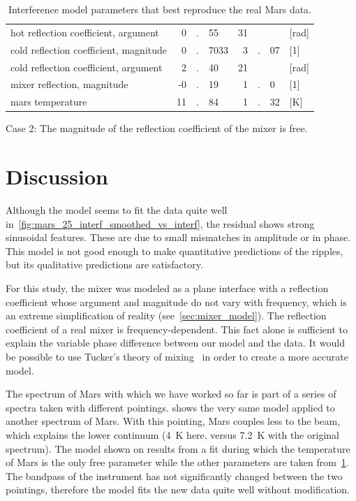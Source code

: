 \begin{table}
\begin{tabular}{l r@{}c@{}l r@{}c@{}l l}
            hot reflection coefficient, argument         &  0&.&55   & 31& &     & [\si{\radian}] \\
            cold reflection coefficient, magnitude       &  0&.&7033 &  3&.&07   & [1]            \\
            cold reflection coefficient, argument        &  2&.&40   & 21& &     & [\si{\radian}] \\
            mixer reflection, magnitude                  & -0&.&19   &  1&.&0    & [1]            \\
            mars temperature                             & 11&.&84   &  1&.&32   & [\si{\kelvin}] \\
        \bottomrule
    \end{tabular}
    \caption*{Case 2: The magnitude of the reflection coefficient of the mixer is free.}
    \caption{Interference model parameters that best reproduce the real Mars data.}
    \label{tab:mars_full_model}
\end{table}



\FloatBarrier



\section{Discussion}

Although the model seems to fit the data quite well in~\cref{fig:mars_25_interf_smoothed_vs_interf}, the residual shows strong sinusoidal features.
These are due to small mismatches in amplitude or in phase.
This model is not good enough to make quantitative predictions of the ripples, but its qualitative predictions are satisfactory.

For this study, the mixer was modeled as a plane interface with a reflection coefficient whose argument and magnitude do not vary with frequency, which is an extreme simplification of reality (see~\vref{sec:mixer_model}).
The reflection coefficient of a real mixer is frequency-dependent.
This fact alone is sufficient to explain the variable phase difference between our model and the data.
It would be possible to use Tucker's theory of mixing~\parencite{tucker1985quantum} in order to create a more accurate model.

The spectrum of Mars with which we have worked so far is part of a series of spectra taken with different pointings.
 shows the very same model applied to another spectrum of Mars.
With this pointing, Mars couples less to the beam, which explains the lower continuum (\SI{4}{\kelvin} here, versus \SI{7.2}{\kelvin} with the original spectrum).
The model shown on  results from a fit during which the temperature of Mars is the only free parameter while the other parameters are taken from~\cref{tab:mars_full_model}.
The bandpass of the instrument has not significantly changed between the two pointings, therefore the model fits the new data quite well without modification.

